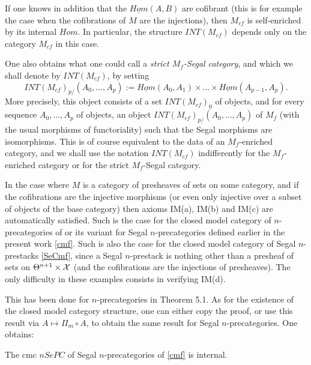 If one knows in addition that the $\underline{Hom} (A,B)$ are cofibrant (this
is for example the case when the cofibrations of $M$ are the injections), then
$M_{cf}$ is self-enriched by its internal $Hom$. In particular, the structure
$INT(M_{cf})$ depends only on the category $M_{cf}$ in this case.


One also obtains what one could call a {\em strict $M_f$-Segal category}, and
which we shall denote by $INT(M_{cf})$, by setting
$$
INT(M_{cf})_{p/}(A_0,\ldots , A_p):=
\underline{Hom}(A_0,A_1)\times \ldots \times \underline{Hom}(A_{p-1}, A_p).
$$
More precisely, this object consists of a set $INT(M_{cf})_0$ of objects, and
for every sequence $A_0,\ldots , A_p$ of objects, an object
$INT(M_{cf})_{p/}(A_0,\ldots , A_p)$ of $M_f$ (with the usual morphisms of
functoriality) such that the Segal morphisms are isomorphisms. This is of
course equivalent to the data of an $M_f$-enriched category, and we shall use
the notation $INT(M_{cf})$ indifferently for the $M_f$-enriched category or
for the strict $M_f$-Segal category.






In the case where $M$ is a category of presheaves of sets on some category, and
if the cofibrations are the injective morphisms (or even only injective over a
subset of objects of the base category) then axioms IM(a), IM(b) and IM(c) are
automatically satisfied.
Such is the case for the closed model category of $n$-precategories of
\cite{nCAT} or its variant for Segal $n$-precategories defined earlier in the
present work \ref{cmf}. Such is also the case for the closed model category
of Segal $n$-prestacks \ref{SeCmf}, since a Segal $n$-prestack is nothing other
than a presheaf of sets on $\Theta ^{n+1} \times {\cal X}$ (and the cofibrations are
the injections of presheaves).
The only difficulty in these examples consists in verifying IM(d).

This has been done
for $n$-precategories in \cite{nCAT} Theorem 5.1. As for the existence of the
closed model category structure, one can either copy the proof, or use this
result via $A\mapsto \Pi _m \circ A$, to obtain the same result for Segal
$n$-precategories. One obtains:

\begin{lemma}
The cmc $nSePC$ of Segal $n$-precategories of \ref{cmf} is
internal.
\end{lemma}
\eop





